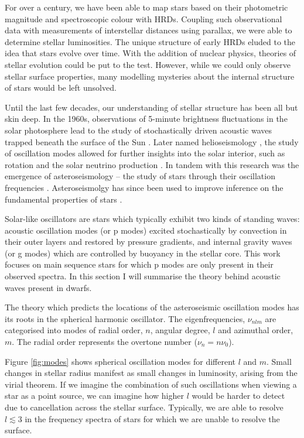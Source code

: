 For over a century, we have been able to map stars based on their photometric magnitude and spectroscopic colour with HRDs. Coupling such observational data with measurements of interstellar distances using parallax, we were able to determine stellar luminosities. The unique structure of early HRDs eluded to the idea that stars evolve over time. With the addition of nuclear physics, theories of stellar evolution could be put to the test. However, while we could only observe stellar surface properties, many modelling mysteries about the internal structure of stars would be left unsolved.

Until the last few decades, our understanding of stellar structure has been all but skin deep. In the 1960s, observations of 5-minute brightness fluctuations in the solar photosphere lead to the study of stochastically driven acoustic waves trapped beneath the surface of the Sun \citep{Ulrich1970, Ando.Osaki1975}. Later named helioseismology \citep{Deubner.Gough1984}, the study of oscillation modes allowed for further insights into the solar interior, such as rotation \citep{Deubner.Ulrich.ea1979} and the solar neutrino production \citep{Bahcall.Ulrich1988}. In tandem with this research was the emergence of asteroseismology -- the study of stars through their oscillation frequencies \citep{Christensen-Dalsgaard1984}. Asteroseismolgy has since been used to improve inference on the fundamental properties of stars \citep[see, e.g.][]{Ulrich1986, Soderblom2010, SilvaAguirre.Davies.ea2015}.

Solar-like oscillators are stars which typically exhibit two kinds of standing waves: acoustic oscillation modes (or p modes) excited stochastically by convection in their outer layers and restored by pressure gradients, and internal gravity waves (or g modes) which are controlled by buoyancy in the stellar core. This work focuses on main sequence stars for which p modes are only present in their observed spectra. In this section I will summarise the theory behind acoustic waves present in dwarfs.

The theory which predicts the locations of the asteroseismic oscillation modes has its roots in the spherical harmonic oscillator. The eigenfrequencies, $\nu_{nlm}$ are categorised into modes of radial order, $n$, angular degree, $l$ and azimuthal order, $m$. The radial order represents the overtone number ($\nu_n = n\nu_0$). 

Figure \ref{fig:modes} shows spherical oscillation modes for different $l$ and $m$. Small changes in stellar radius manifest as small changes in luminosity, arising from the virial theorem. If we imagine the combination of such oscillations when viewing a star as a point source, we can imagine how higher $l$ would be harder to detect due to cancellation across the stellar surface. Typically, we are able to resolve $l \lesssim 3$ in the frequency spectra of stars for which we are unable to resolve the surface.

